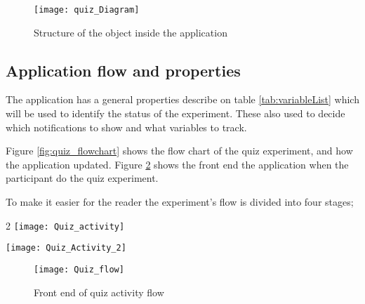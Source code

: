 \begin{figure}[!b]
\begin{center}
\texttt{[image: quiz\_Diagram]}
\end{center}
\centering
\captionsetup{justification=centering}
\caption{Structure of the object inside the application}
\label{fig:Experiment_objects}
\end{figure}


\subsection{Application flow and properties}

The application has a general properties describe on table \ref{tab:variableList} which will be used to identify the status of the experiment.
These  also used to decide which notifications to show and what variables to track.

Figure \ref{fig:quiz_flowchart} shows the flow chart of the quiz experiment, and how the application  updated.
Figure \ref{fig:quiz_flow} shows the front end the application when the participant do the quiz experiment.

To make it easier for the reader the experiment's flow is divided into four stages;
\begin{figure*}[!b]
\begin{multicols}{2}
    \texttt{[image: Quiz\_activity]}\par
    \texttt{[image: Quiz\_Activity\_2]}\par
    \end{multicols}
\centering
\captionsetup{justification=centering}
\caption{Quiz flowchart}
\label{fig:quiz_flowchart}
\end{figure*}


\begin{figure}[!t]
\begin{center}
\texttt{[image: Quiz\_flow]}
\end{center}
\centering
\captionsetup{justification=centering}
\caption{Front end of quiz activity flow}
\label{fig:quiz_flow}
\end{figure}

